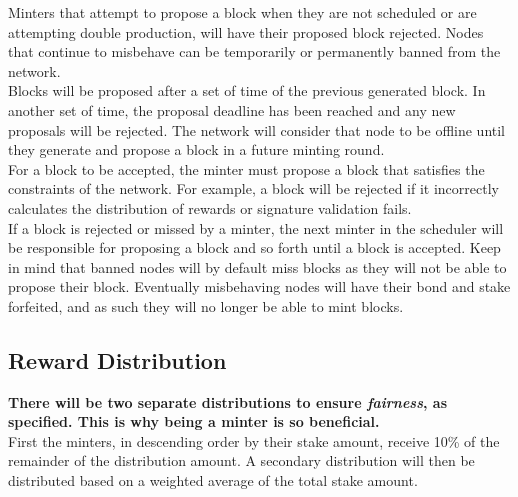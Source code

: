 \documentclass[12pt,a4paper]{article}
\begin{document}
  Minters that attempt to propose a block when they are not scheduled or are
  attempting double production, will have their proposed block rejected. Nodes
  that continue to misbehave can be temporarily or permanently banned from the
  network.\\

  Blocks will be proposed after a set of time of the previous generated block.
  In another set of time, the proposal deadline has been reached and any new
  proposals will be rejected. The network will consider that node to be offline
  until they generate and propose a block in a future minting round.\\

  For a block to be accepted, the minter must propose a block that satisfies the
  constraints of the network. For example, a block will be rejected if it
  incorrectly calculates the distribution of rewards or signature validation
  fails.\\

  If a block is rejected or missed by a minter, the next minter in the scheduler
  will be responsible for proposing a block and so forth until a block is
  accepted. Keep in mind that banned nodes will by default miss blocks as they
  will not be able to propose their block. Eventually misbehaving nodes will
  have their bond and stake forfeited, and as such they will no longer be able
  to mint blocks.\\

  \subsection{Reward Distribution}
  \textbf{There will be two separate distributions to ensure \textit{fairness},
  as specified. This is why being a minter is so beneficial.}\\

  First the minters, in descending order by their stake amount, receive 10\% of
  the remainder of the distribution amount. A secondary distribution will then
  be distributed based on a weighted average of the total stake amount.
\end{document}
